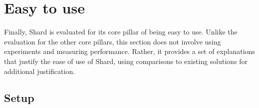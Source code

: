 \documentclass[twoside]{report}
\begin{document}
\section{Easy to use}


Finally, Shard is evaluated for its core pillar of being easy to use.
Unlike the evaluation for the other core pillars, this section does not involve using experiments and measuring performance.
Rather, it provides a set of explanations that justify the ease of use of Shard, using comparisons to existing solutions for additional justification.

\subsection{Setup}
\end{document}
